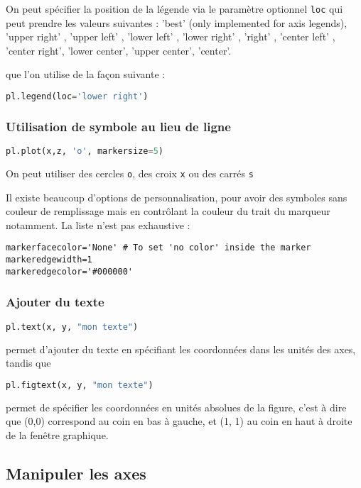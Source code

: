 \documentclass[a4paper,twoside]{article}
\begin{document}
\bigskip

On peut spécifier la position de la légende via le paramètre optionnel \texttt{loc} qui peut prendre les valeurs suivantes :
'best' (only implemented for axis legends), 'upper right' , 'upper left' , 'lower left' , 'lower right' , 'right' , 'center left' , 'center right', 'lower center', 'upper center', 'center'.

que l'on utilise de la façon suivante :
 \begin{lstlisting}[language=python]
pl.legend(loc='lower right')
\end{lstlisting}


\subsubsection{Utilisation de symbole au lieu de ligne}
\begin{lstlisting}[language=python]
pl.plot(x,z, 'o', markersize=5)
\end{lstlisting}
On peut utiliser des cercles \texttt{o}, des croix \texttt{x} ou des carrés \texttt{s}

Il existe beaucoup d'options de personnalisation, pour avoir des symboles sans couleur de remplissage mais en contrôlant la couleur du trait du marqueur notamment. La liste n'est pas exhaustive : 
\begin{verbatim}
markerfacecolor='None' # To set 'no color' inside the marker
markeredgewidth=1
markeredgecolor='#000000'
\end{verbatim}

\subsubsection{Ajouter du texte}
\begin{lstlisting}[language=python]
pl.text(x, y, "mon texte")
\end{lstlisting}
permet d'ajouter du texte en spécifiant les coordonnées dans les unités des axes, tandis que
\begin{lstlisting}[language=python]
pl.figtext(x, y, "mon texte")
\end{lstlisting}
permet de spécifier les coordonnées en unités absolues de la figure, c'est à dire que (0,0) correspond au coin en bas à gauche, et (1, 1) au coin en haut à droite de la fenêtre graphique.

\subsection{Manipuler les axes}
\end{document}
